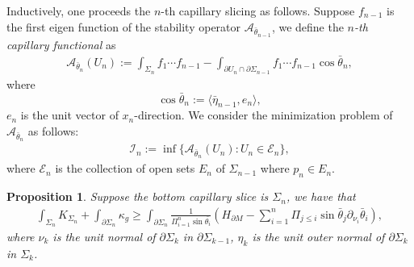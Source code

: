 \documentclass[11pt,letterpaper]{amsart}
\newtheorem{prop}{Proposition}[section]
\begin{document}
Inductively, one proceeds the $n$-th capillary slicing as follows. Suppose $f_{n-1}$ is the first eigen function of the stability operator $\mathcal A_{\bar{\theta}_{n-1}}$, we define the \textit{$n$-th capillary functional} as 
\begin{align}
    \mathcal A_{\bar{\theta}_n}(U_n):=\int_{\Sigma_n}f_1\cdots f_{n-1}-\int_{\partial U_n\cap \partial \Sigma_{n-1}}f_1\cdots f_{n-1}\cos\bar{\theta}_n,
\end{align}
where 
\[
\cos\bar{\theta}_n:=\langle \bar{\eta}_{n-1},e_n\rangle,
\]
$e_n$ is the unit vector of $x_{n}$-direction.
We consider the minimization problem of $\mathcal A_{\bar{\theta}_n}$ as follows:
\begin{align}
    \mathcal I_n:=\inf\{\mathcal A_{\bar{\theta}_n}(U_n):U_n\in \mathcal E_n\},
\end{align}
where $\mathcal E_n$ is the collection of open sets $E_n$ of $\Sigma_{n-1}$ where $p_n\in E_{n}$.

\begin{prop}\label{prop: n-th slicing}
Suppose the bottom capillary slice is $\Sigma_n$, we have that
    \begin{align}
    \int_{\Sigma_n}K_{\Sigma_n}+\int_{\partial\Sigma_n}\kappa_g\geq \int_{\partial\Sigma_n}\frac{1}{\Pi_{i=1}^n\sin\bar{\theta_i}}\left(H_{\partial M}-\sum_{i=1}^n\Pi_{j\leq i}\sin\bar{\theta}_j\partial_{\nu_i}\bar{\theta}_i\right),
    \end{align}
    where $\nu_k$ is the unit normal of $\partial\Sigma_k$ in $\partial\Sigma_{k-1}$, $\eta_k$ is the unit outer normal of $\partial\Sigma_k$ in $\Sigma_k$.
\end{prop}
\end{document}
